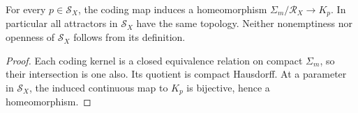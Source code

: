 \begin{proposition}
\label{prop:kernel-quotient}
For every $p\in\mathcal S_X$, the coding map induces a homeomorphism
$\Sigma_m/\mathscr R_X\to K_p$. In particular all attractors in
$\mathcal S_X$ have the same topology. Neither nonemptiness nor
openness of $\mathcal S_X$ follows from its definition.
\end{proposition}
\begin{proof}
Each coding kernel is a closed equivalence relation on compact
$\Sigma_m$, so their intersection is one also. Its quotient is
compact Hausdorff. At a parameter in $\mathcal S_X$, the induced
continuous map to $K_p$ is bijective, hence a homeomorphism.
\end{proof}

